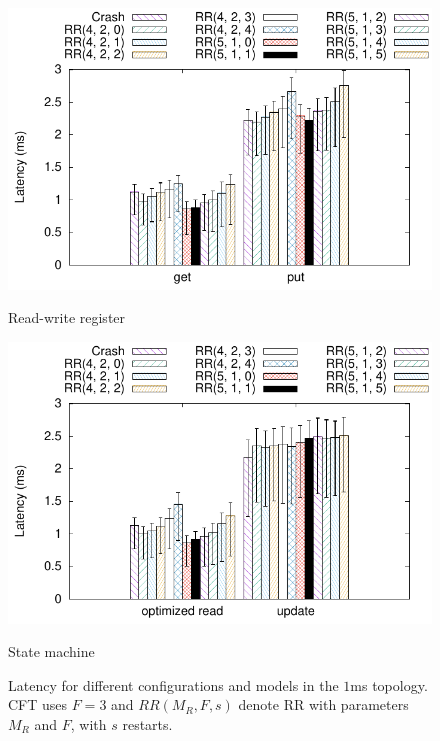 \begin{figure}[t]
    \centering
    \begin{minipage}[t]{.49\linewidth}
        \includegraphics[width=\linewidth]{teem_results/protocol/1ms/parameter/reg_parameter}
        \caption{Read-write register}\label{fig:1ms_reg_lat_conf}
    \end{minipage}
    \begin{minipage}[t]{.49\linewidth}
        \includegraphics[width=\linewidth]{teem_results/protocol/1ms/parameter/smr_parameter}
        \caption{State machine}\label{fig:1ms_smr_lat_conf}
    \end{minipage}
    \caption{Latency for
    different configurations and models in the $1$ms topology. \ac{CFT} uses
    $F=3$ and $RR(M_R, F, s)$ denote \ac{RR} with parameters $M_R$ and
    $F$, with $s$ restarts.}
\end{figure}\label{fig:protocol_parameter_lat}

